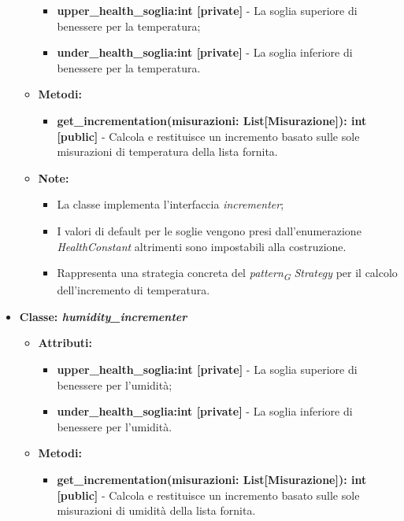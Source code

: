 \begin{itemize}
\begin{itemize}
        \begin{itemize}
        \item \textbf{upper\_health\_soglia:int [private]} - La soglia superiore di benessere per la temperatura;
        \item \textbf{under\_health\_soglia:int [private]} - La soglia inferiore di benessere per la temperatura.
    \end{itemize}
    \item \textbf{Metodi: }
    \begin{itemize}
        \item \textbf{get\_incrementation(misurazioni: List[Misurazione]): int [public]} - Calcola e restituisce un incremento basato sulle sole misurazioni di temperatura della lista fornita.
    \end{itemize}
    \item\textbf{Note:}
        \begin{itemize}
            \item La classe implementa l'interfaccia \textit{incrementer};
            \item I valori di default per le soglie vengono presi dall'enumerazione \textit{HealthConstant} altrimenti sono impostabili alla costruzione.
            \item Rappresenta una strategia concreta del \textit{pattern}\textsubscript{\textit{G}} \textit{Strategy} per il calcolo dell'incremento di temperatura.
        \end{itemize}
    \end{itemize}
    \item{\textbf{Classe: \textit{humidity\_incrementer}}}
    \begin{itemize}
    \item\textbf{Attributi:}
        \begin{itemize}
        \item \textbf{upper\_health\_soglia:int [private]} - La soglia superiore di benessere per l'umidità;
        \item \textbf{under\_health\_soglia:int [private]} - La soglia inferiore di benessere per l'umidità.
    \end{itemize}
    \item \textbf{Metodi: }
    \begin{itemize}
        \item \textbf{get\_incrementation(misurazioni: List[Misurazione]): int [public]} - Calcola e restituisce un incremento basato sulle sole misurazioni di umidità della lista fornita.

\end{itemize}
\end{itemize}
\end{itemize}
